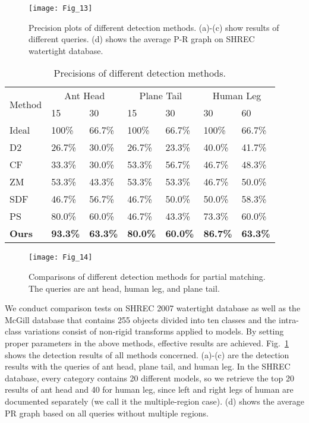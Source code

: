 \begin{figure}[!to]
\texttt{[image: Fig\_13]}
\caption[Precision plots of different detection methods.]
    {Precision plots of different detection methods. (a)-(c) show
    results of different queries. (d) shows the average P-R graph on SHREC
    watertight database.}
\label{PR}
\end{figure}

\begin{table}
\centering
\caption[Precisions of different detection methods.]
 {Precisions of different detection methods.}
  \label{table:precision}
  \renewcommand{\arraystretch}{1.3}
\begin{tabular}{p{}|p{} p{}|p{}p{}|p{}p{}}
\hline %
\multirow{2}{*}{Method} &
\multicolumn{2}{c|}{Ant Head} &
\multicolumn{2}{c|}{Plane Tail} &
\multicolumn{2}{c}{Human Leg} \\
\cline{2-7}
& 15 & 30 & 15 & 30 & 30 & 60\\
\hline
Ideal & 100\% & 66.7\% & 100\% & 66.7\%  & 100\% & 66.7\% \\
D2 & 26.7\% & 30.0\% & 26.7\% & 23.3\%  & 40.0\% & 41.7\% \\
CF & 33.3\% & 30.0\% & 53.3\% & 56.7\%  & 46.7\% & 48.3\% \\
ZM & 53.3\% & 43.3\% & 53.3\% & 53.3\%  & 46.7\% & 50.0\% \\
SDF & 46.7\% & 56.7\% & 46.7\% & 50.0\% & 50.0\% & 58.3\% \\
PS & 80.0\% & 60.0\% & 46.7\% & 43.3\%  & 73.3\% & 60.0\% \\
\textbf{Ours} & \textbf{93.3\%} & \textbf{63.3\%} & \textbf{80.0\%} & \textbf{60.0\%}  & \textbf{86.7\%} & \textbf{63.3\%}\\
\hline
\end{tabular}
\end{table}

\begin{figure*}
\begin{center}
\texttt{[image: Fig\_14]}
\end{center}
\caption[Comparisons of different detection methods for partial matching.]
 {Comparisons of different detection methods for partial
  matching. The queries are ant head, human leg, and plane tail.}
\label{comparison}
\end{figure*}

We conduct comparison tests on SHREC 2007 watertight database as well
as the McGill database that contains 255 objects divided into ten
classes and the intra-class variations consist of non-rigid transforms
applied to models. By setting proper parameters in the above methods,
effective results are achieved. Fig.~\ref{PR} shows the detection
results of all methods concerned. (a)-(c) are the detection results
with the queries of ant head, plane tail, and human leg.  In the SHREC
database, every category contains 20 different models, so we retrieve
the top 20 results of ant head and 40 for human leg, since left and
right legs of human are documented separately (we call it the
multiple-region case). (d) shows the average PR graph based on all
queries without multiple regions.

